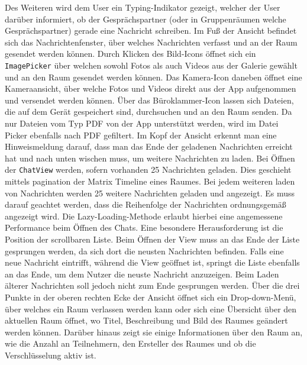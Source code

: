     Des Weiteren wird dem User ein Typing-Indikator gezeigt, welcher der User darüber informiert, ob der Gesprächspartner (oder in Gruppenräumen welche Gesprächspartner) gerade eine Nachricht schreiben.
    Im Fuß der Ansicht befindet sich das Nachrichtenfenster, über welches Nachrichten verfasst und an der Raum gesendet werden können.
    Durch Klicken des Bild-Icons öffnet sich ein \texttt{ImagePicker} über welchen sowohl Fotos als auch Videos aus der Galerie gewählt und an den Raum gesendet werden können.
    Das Kamera-Icon daneben öffnet eine Kameraansicht, über welche Fotos und Videos direkt aus der App aufgenommen und versendet werden können.
    Über das Büroklammer-Icon lassen sich Dateien, die auf dem Gerät gespeichert sind, durchsuchen und an den Raum senden.
    Da nur Dateien vom Typ PDF von der App unterstützt werden, wird im Datei Picker ebenfalls nach PDF gefiltert.
    Im Kopf der Ansicht erkennt man eine Hinweismeldung darauf, dass man das Ende der geladenen Nachrichten erreicht hat und nach unten wischen muss, um weitere Nachrichten zu laden.
    Bei Öffnen der \texttt{ChatView} werden, sofern vorhanden 25 Nachrichten geladen.
    Dies geschieht mittels pagination der Matrix Timeline eines Raumes.
    Bei jedem weiteren laden von Nachrichten werden 25 weitere Nachrichten geladen und angezeigt.
    Es muss darauf geachtet werden, dass die Reihenfolge der Nachrichten ordnungsgemäß angezeigt wird.
    Die Lazy-Loading-Methode erlaubt hierbei eine angemessene Performance beim Öffnen des Chats.
    Eine besondere Herausforderung ist die Position der scrollbaren Liste.
    Beim Öffnen der View muss an das Ende der Liste gesprungen werden, da sich dort die neusten Nachrichten befinden.
    Falls eine neue Nachricht eintrifft, während die View geöffnet ist, springt die Liste ebenfalls an das Ende, um dem Nutzer die neuste Nachricht anzuzeigen.
    Beim Laden älterer Nachrichten soll jedoch nicht zum Ende gesprungen werden.
    Über die drei Punkte in der oberen rechten Ecke der Ansicht öffnet sich ein Drop-down-Menü, über welches ein Raum verlassen werden kann oder sich eine Übersicht über den aktuellen Raum öffnet, wo Titel, Beschreibung und Bild des Raumes geändert werden können.
    Darüber hinaus zeigt sie einige Informationen über den Raum an, wie die Anzahl an Teilnehmern, den Ersteller des Raumes und ob die Verschlüsselung aktiv ist.

    \newpage
